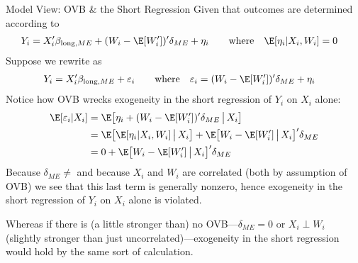 \documentclass[aspectratio=169, handout]{beamer}
\begin{document}
{\footnotesize
\begin{frame}{Model View: OVB \& the Short Regression}
Given that outcomes are determined according to
\begin{align*}
  Y_i
  &=
  X_i'\beta_{\text{long},ME}
  +
  (W_i-\E[W_i'])'\delta_{ME}
  +
  \eta_i
  \qquad\text{where}\quad
  \E[\eta_i|X_i,W_i]
  = 0
\end{align*}
Suppose we rewrite as
\begin{align*}
  Y_i
  &=
  X_i'\beta_{\text{long},ME}
  +
  \varepsilon_i
  \qquad\text{where}\quad
  \varepsilon_i
  =
  (W_i-\E[W_i'])'\delta_{ME}
  +
  \eta_i
\end{align*}
Notice how OVB wrecks exogeneity in the short regression of $Y_i$ on
$X_i$ alone:
\begin{align*}
  \E[\varepsilon_i|X_i]
  &=
  \E\big[
    \eta_i
    +
    (W_i-\E[W_i'])'\delta_{ME}
    \,\big|\,
    X_i
  \big]
  \\
  &=
  \E\big[
    \E[\eta_i|X_i,W_i]
    \,\big|\,
    X_i
  \big]
  +
  \E\big[
    W_i-\E[W_i']
    \,\big|\,
    X_i
  \big]'
  \delta_{ME}
  \\
  &=
  0
  +
  \E\big[
    W_i-\E[W_i']
    \,\big|\,
    X_i
  \big]'
  \delta_{ME}
\end{align*}
Because $\delta_{ME}\neq$ and because $X_i$ and $W_i$ are correlated
(both by assumption of OVB)
we see that this last term is generally nonzero, hence exogeneity in the
short regression of $Y_i$ on $X_i$ alone is violated.

Whereas if there is (a little stronger than) no OVB---$\delta_{ME}=0$ or
$X_i\perp W_i$ (slightly stronger than just uncorrelated)---exogeneity
in the short regression would hold by the same sort of calculation.
\end{frame}
}
\end{document}
